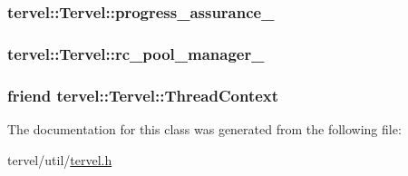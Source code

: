 \subsubsection[{progress\+\_\+assurance\+\_\+}]{ tervel\+::\+Tervel\+::progress\+\_\+assurance\+\_\+\hspace{0.3cm}{\ttfamily [private]}}\label{classtervel_1_1_tervel_a011a5b3732c1482ac6cc87cb47d20b42}
\hypertarget{classtervel_1_1_tervel_a86681b7ea969722f86234c70b9d97a83}{}
\subsubsection[{rc\+\_\+pool\+\_\+manager\+\_\+}]{ tervel\+::\+Tervel\+::rc\+\_\+pool\+\_\+manager\+\_\+\hspace{0.3cm}{\ttfamily [private]}}\label{classtervel_1_1_tervel_a86681b7ea969722f86234c70b9d97a83}
\hypertarget{classtervel_1_1_tervel_a6322cb41e5b57f070b02dd1b1f54cea2}{}
\subsubsection[{Thread\+Context}]{\setlength{\rightskip}{0pt plus 5cm}friend tervel\+::\+Tervel\+::\+Thread\+Context\hspace{0.3cm}{\ttfamily [private]}}\label{classtervel_1_1_tervel_a6322cb41e5b57f070b02dd1b1f54cea2}


The documentation for this class was generated from the following file\+:\begin{DoxyCompactItemize}
\item 
tervel/util/\hyperlink{tervel_8h}{tervel.\+h}\end{DoxyCompactItemize}
